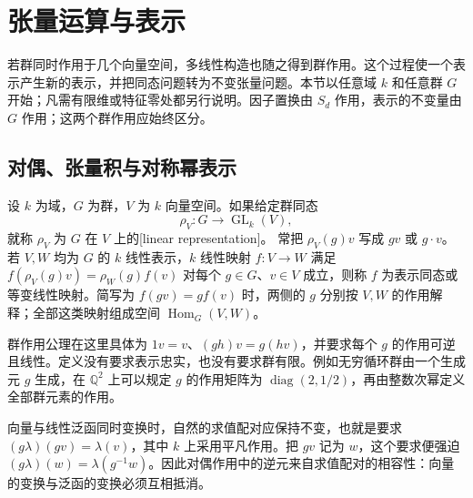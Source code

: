 
\section{张量运算与表示}
\label{b2:sec:0804}

若群同时作用于几个向量空间，多线性构造也随之得到群作用。这个过程使一个表示产生新的表示，并把同态问题转为不变张量问题。本节以任意域 \(k\) 和任意群 \(G\) 开始；凡需有限维或特征零处都另行说明。因子置换由 \(S_d\) 作用，表示的不变量由 \(G\) 作用；这两个群作用应始终区分。

%
%
%

\subsection{对偶、张量积与对称幂表示}
\label{b2:subsec:0804:01}

\begin{definition}\label{b2:def:linear-representation}
	设 \(k\) 为域，\(G\) 为群，\(V\) 为 \(k\) 向量空间。如果给定群同态
	\[
		\rho_V:G\longrightarrow\operatorname{GL}_k(V),
	\]
	就称 \(\rho_V\) 为 \(G\) 在 \(V\) 上的[linear representation]。 常把 \(\rho_V(g)v\) 写成 \(gv\) 或 \(g\cdot v\)。若 \(V,W\) 均为 \(G\) 的 \(k\) 线性表示，\(k\) 线性映射 \(f:V\rightarrow W\) 满足 \(f(\rho_V(g)v)=\rho_W(g)f(v)\) 对每个 \(g\in G\)、\(v\in V\) 成立，则称 \(f\) 为表示同态或等变线性映射。简写为 \(f(gv)=gf(v)\) 时，两侧的 \(g\) 分别按 \(V,W\) 的作用解释；全部这类映射组成空间 \(\operatorname{Hom}_G(V,W)\)。
\end{definition}

群作用公理在这里具体为 \(1v=v\)、\((gh)v=g(hv)\)，并要求每个 \(g\) 的作用可逆且线性。定义没有要求表示忠实，也没有要求群有限。例如无穷循环群由一个生成元 \(g\) 生成，在 \(\mathbb Q^2\) 上可以规定 \(g\) 的作用矩阵为 \(\operatorname{diag}(2,1/2)\)，再由整数次幂定义全部群元素的作用。

\ProseParagraphBreak
向量与线性泛函同时变换时，自然的求值配对应保持不变，也就是要求 \((g\lambda)(gv)=\lambda(v)\)，其中 \(k\) 上采用平凡作用。把 \(gv\) 记为 \(w\)，这个要求便强迫 \((g\lambda)(w)=\lambda(g^{-1}w)\)。因此对偶作用中的逆元来自求值配对的相容性：向量的变换与泛函的变换必须互相抵消。

